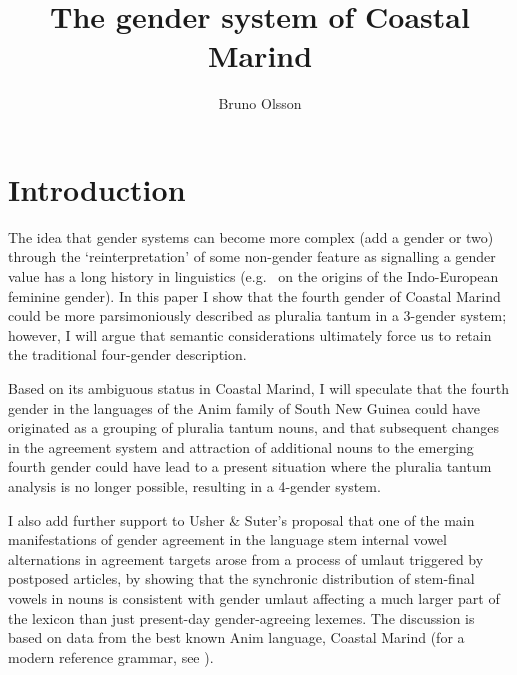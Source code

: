 \documentclass[output=collectionpaper]{langsci/langscibook}
\author{Bruno Olsson\affiliation{Australian National University}
}
\title{The gender system of Coastal Marind}
\begin{document}
\section{Introduction}
The idea that gender systems can become more complex (add a gender or two) through the `reinterpretation' of some non-gender feature as signalling a gender value has a long history in linguistics (e.g.\ \citealt{Brugmann1891} on the origins of the Indo-European feminine gender). In this paper I show that the fourth gender of Coastal Marind could be more parsimoniously described as pluralia tantum in a 3-gender system; however, I will argue that semantic considerations ultimately force us to retain the traditional four-gender description.

Based on its ambiguous status in Coastal Marind, I will speculate that the fourth gender in the languages of the Anim family of South New Guinea could have originated as a grouping of pluralia tantum nouns, and that subsequent changes in the agreement system and attraction of additional nouns to the emerging fourth gender could have lead to a present situation where the pluralia tantum analysis is no longer possible, resulting in a 4-gender system.

I also add further support to Usher \& Suter's \parencite*{Usher2015} proposal that one of the main manifestations of gender agreement in the language \textendash{} stem internal vowel alternations in agreement targets \textendash{} arose from a process of umlaut triggered by postposed articles, by showing that the synchronic distribution of stem-final vowels in nouns is consistent with gender umlaut affecting a much larger part of the lexicon than just present-day gender-agreeing lexemes. The discussion is based on data from the best known Anim language, Coastal Marind (for a modern reference grammar, see \citealt{Olsson2017}).
\end{document}
